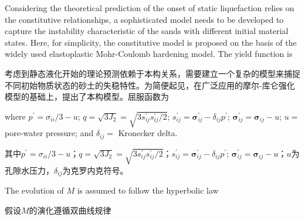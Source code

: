 \begin{ParaColumn}
    
    Considering the theoretical prediction of the onset of static liquefaction relies on the constitutive relationships, a sophisticated model needs to be developed to capture the instability characteristic of the sands with different initial material states. Here, for simplicity, the constitutive model is proposed on the basis of the widely used elastoplastic Mohr-Coulomb hardening model. The yield function is
    
    \switchcolumn

    考虑到静态液化开始的理论预测依赖于本构关系，需要建立一个复杂的模型来捕捉不同初始物质状态的砂土的失稳特性。为简便起见，在广泛应用的摩尔-库仑强化模型的基础上，提出了本构模型。屈服函数为

    \switchcolumn*

    \noindent
    where $p^{\prime}=\sigma_{i i} / 3-u$; $q=\sqrt{3 J_{2}}=\sqrt{3 s_{i j}^{\prime} s_{i j}^{\prime} / 2}$; $s_{i j}^{\prime}=\boldsymbol{\sigma}_{i j}^{\prime}-\delta_{i j} p^{\prime}$; $\boldsymbol{\sigma}_{i j}^{\prime}=\boldsymbol{\sigma}_{i j}-u$; $u=$ pore-water pressure; and $\delta_{i j}=$ Kronecker delta.

    \switchcolumn

    \noindent
    其中$p^{\prime}=\sigma_{i i} / 3-u$；$q=\sqrt{3 J_{2}}=\sqrt{3 s_{i j}^{\prime} s_{i j}^{\prime} / 2}$；$s_{i j}^{\prime}=\boldsymbol{\sigma}_{i j}^{\prime}-\delta_{i j} p^{\prime}$; $\boldsymbol{\sigma}_{i j}^{\prime}=\boldsymbol{\sigma}_{i j}-u$；$u$为孔隙水压力，$\delta_{i j}$为克罗内克符号。

    \switchcolumn*

    The evolution of $M$ is assumed to follow the hyperbolic law \citep{Pietruszczak1987,Huang2010}

    \switchcolumn

    假设$M$的演化遵循双曲线规律\citep{Pietruszczak1987,Huang2010}

    \switchcolumn*


\end{ParaColumn}
